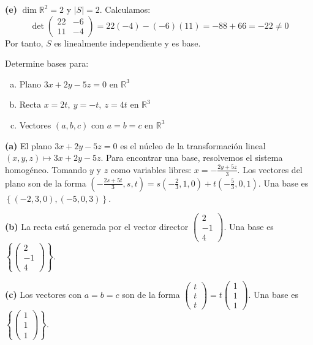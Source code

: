 \begin{prob}
\begin{myproof}
\textbf{(e)} $\dim \mathbb{R}^2 = 2$ y $|S|=2$. Calculamos: 
$$\det \begin{pmatrix}22&-6\\11&-4\end{pmatrix} = 22(-4) - (-6)(11) = -88 + 66 = -22 \neq 0$$
Por tanto, $S$ es linealmente independiente y es base.
\end{myproof}
\end{prob}

\begin{prob} Determine bases para:
\begin{enumerate}[(a)]
\item Plano $3x+2y-5z=0$ en $\mathbb{R}^3$
\item Recta $x=2t,\ y=-t,\ z=4t$ en $\mathbb{R}^3$
\item Vectores $(a,b,c)$ con $a=b=c$ en $\mathbb{R}^3$
\end{enumerate}

\begin{myproof}
\textbf{(a)} El plano $3x+2y-5z=0$ es el núcleo de la transformación lineal $(x,y,z) \mapsto 3x+2y-5z$. Para encontrar una base, resolvemos el sistema homogéneo. Tomando $y$ y $z$ como variables libres: $x = -\frac{2y+5z}{3}$. Los vectores del plano son de la forma $\left(-\frac{2s+5t}{3}, s, t\right) = s\left(-\frac{2}{3}, 1, 0\right) + t\left(-\frac{5}{3}, 0, 1\right)$. Una base es $\left\{\left(-2, 3, 0\right), \left(-5, 0, 3\right)\right\}$.

\textbf{(b)} La recta está generada por el vector director $\begin{pmatrix}2\\-1\\4\end{pmatrix}$. Una base es $\left\{\begin{pmatrix}2\\-1\\4\end{pmatrix}\right\}$.

\textbf{(c)} Los vectores con $a=b=c$ son de la forma $\begin{pmatrix}t\\t\\t\end{pmatrix} = t\begin{pmatrix}1\\1\\1\end{pmatrix}$. Una base es $\left\{\begin{pmatrix}1\\1\\1\end{pmatrix}\right\}$.
\end{myproof}
\end{prob}

